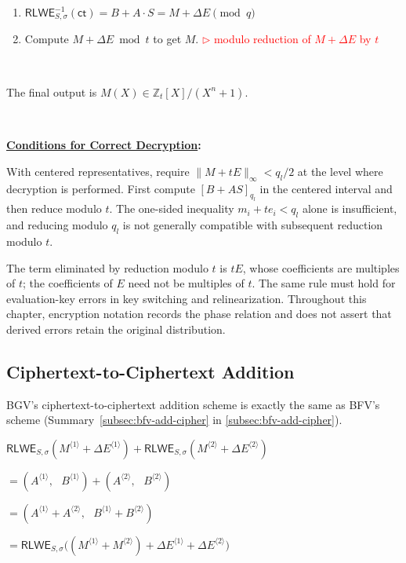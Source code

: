 \begin{tcolorbox}[title={\textbf{\tboxlabel{\ref*{subsec:bgv-enc-dec}} BGV Encryption and Decryption}}]
\begin{enumerate}
\item $\textsf{RLWE}^{-1}_{S,\sigma}(\textsf{ct}) = B + A \cdot S  = M + \Delta E \pmod q$

\item Compute $M + \Delta E \bmod t$ to get $M$. \textcolor{red}{ $\rhd$ modulo reduction of $M + \Delta E$ by $t$}

\end{enumerate}

$ $

The final output is $M(X) \in \mathbb{Z}_t[X] / (X^n + 1)$.

$ $

\textbf{\underline{Conditions for Correct Decryption}:}

With centered representatives, require $\|M+tE\|_\infty<q_l/2$ at the level where decryption is performed. First compute $[B+AS]_{q_l}$ in the centered interval and then reduce modulo $t$. The one-sided inequality $m_i+te_i<q_l$ alone is insufficient, and reducing modulo $q_l$ is not generally compatible with subsequent reduction modulo $t$.


\end{tcolorbox}

The term eliminated by reduction modulo $t$ is $tE$, whose coefficients are multiples of $t$; the coefficients of $E$ need not be multiples of $t$. The same rule must hold for evaluation-key errors in key switching and relinearization. Throughout this chapter, encryption notation records the phase relation and does not assert that derived errors retain the original distribution.



\subsection{Ciphertext-to-Ciphertext Addition}
\label{subsec:bgv-add-cipher}

BGV's ciphertext-to-ciphertext addition scheme is exactly the same as BFV's scheme (Summary~\ref*{subsec:bfv-add-cipher} in \autoref{subsec:bfv-add-cipher}).


\begin{tcolorbox}[title={\textbf{\tboxlabel{\ref*{subsec:bgv-add-cipher}} BGV Ciphertext-to-Ciphertext Addition}}]
$\textsf{RLWE}_{S, \sigma}(M^{\langle 1 \rangle} + \Delta E^{\langle 1 \rangle} ) + \textsf{RLWE}_{S, \sigma}(M^{\langle 2 \rangle} + \Delta E^{\langle 2 \rangle}) $

$ = ( A^{\langle 1 \rangle}, \text{ } B^{\langle 1 \rangle}) + (A^{\langle 2 \rangle}, \text{ } B^{\langle 2 \rangle}) $

$ = ( A^{\langle 1 \rangle} + A^{\langle 2 \rangle}, \text{ } B^{\langle 1 \rangle} + B^{\langle 2 \rangle} ) $

$= \textsf{RLWE}_{S, \sigma}\bm((M^{\langle 1 \rangle} + M^{\langle 2 \rangle})  + \Delta E^{\langle 1 \rangle} + \Delta E^{\langle 2 \rangle} \bm)$
\end{tcolorbox}

